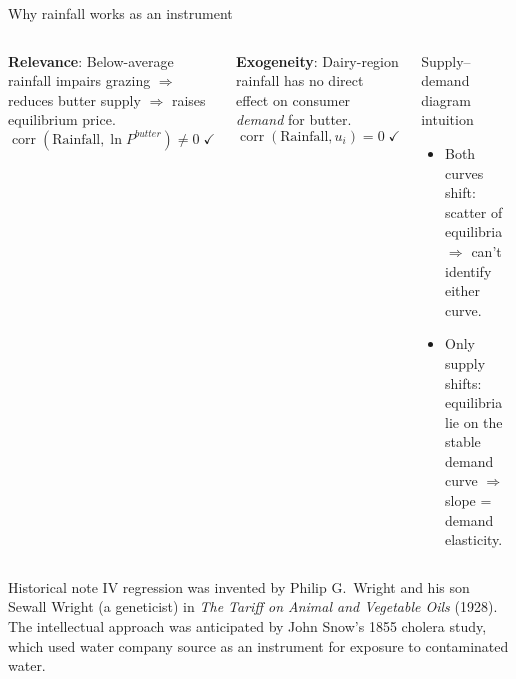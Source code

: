 \documentclass[10pt]{beamer}
\begin{document}
\begin{frame}{Why rainfall works as an instrument}
\label{slide:rainfall_instrument}

\begin{columns}[T,onlytextwidth]
\textbf{Relevance}: Below-average rainfall impairs grazing $\Rightarrow$ reduces butter supply $\Rightarrow$ raises equilibrium price.
\[
\operatorname{corr}(\text{Rainfall}, \ln P^{butter}) \neq 0 \;\checkmark
\]

\vspace{0.5em}
\textbf{Exogeneity}: Dairy-region rainfall has no direct effect on consumer \emph{demand} for butter.
\[
\operatorname{corr}(\text{Rainfall}, u_i) = 0 \;\checkmark
\]

\begin{block}{Supply--demand diagram intuition}
\small
\begin{itemize}
  \item Both curves shift: scatter of equilibria $\Rightarrow$ can't identify either curve.
  \item Only supply shifts: equilibria lie on the stable demand curve $\Rightarrow$ slope = demand elasticity.
\end{itemize}
\end{block}
\end{columns}

\pause
\vspace{0.5em}
\begin{exampleblock}{Historical note}
IV regression was invented by Philip G.\ Wright and his son Sewall Wright (a geneticist) in \emph{The Tariff on Animal and Vegetable Oils} (1928). The intellectual approach was anticipated by John Snow's 1855 cholera study, which used water company source as an instrument for exposure to contaminated water.
\end{exampleblock}
\end{frame}
\end{document}
